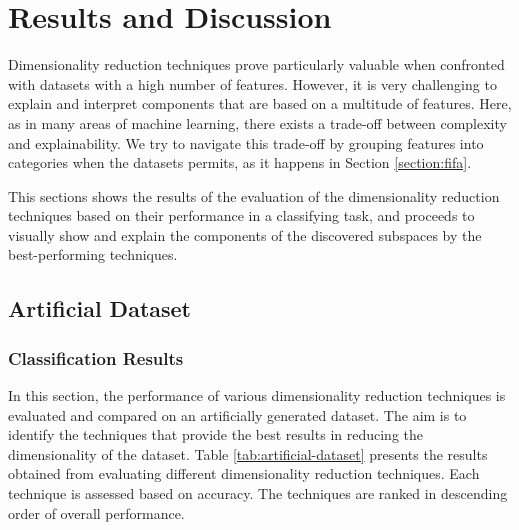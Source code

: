 
\chapter{Results and Discussion}

Dimensionality reduction techniques prove particularly valuable when confronted with datasets with a high number of features. However, it is very challenging to explain and interpret components that are based on a multitude of features. Here, as in many areas of machine learning, there exists a trade-off between complexity and explainability. We try to navigate this trade-off by grouping features into categories when the datasets permits, as it happens in Section \ref{section:fifa}.

This sections shows the results of the evaluation of the dimensionality reduction techniques based on their performance in a classifying task, and proceeds to visually show and explain the components of the discovered subspaces by the best-performing techniques.

\section{Artificial Dataset}

\subsection{Classification Results}
In this section, the performance of various dimensionality reduction techniques is evaluated and compared on an artificially generated dataset. The aim is to identify the techniques that provide the best results in reducing the dimensionality of the dataset.
Table \ref{tab:artificial-dataset} presents the results obtained from evaluating different dimensionality reduction techniques. Each technique is assessed based on accuracy. The techniques are ranked in descending order of overall performance.

